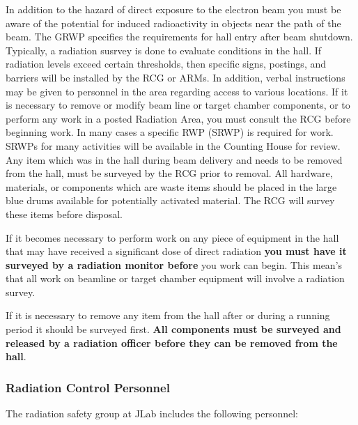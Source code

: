 {In addition to the hazard of direct exposure to the electron beam you must
be aware of the potential for induced radioactivity in objects near the path
of the beam.  The GRWP specifies the requirements for hall entry after beam shutdown.  
Typically, a radiation susrvey is done to evaluate conditions in the hall.  If radiation levels 
exceed certain thresholds, then specific signs, postings, and barriers will be installed by the 
RCG or ARMs.  In addition, verbal instructions may be given to personnel in the area 
regarding access to various locations.  If it is necessary to remove or modify beam line or 
target chamber components, or to perform any work in a posted Radiation Area, you must 
consult the RCG before beginning work.  In many cases a specific RWP (SRWP) is 
required for work.  SRWPs for many activities will be available in the Counting House for 
review.  Any item which was in the hall during beam delivery and needs to be removed 
from the hall, must be surveyed by the RCG prior to removal.  All hardware, materials, or 
components which are waste items should be placed in the large blue drums available for 
potentially activated material.  The RCG will survey these items before disposal. 

If it becomes necessary to perform work on any piece of equipment in the hall
that may have received a significant dose of direct radiation {\bf you
must have it surveyed by a radiation monitor before} you work can begin.
This mean's that all work on beamline or target chamber equipment will
involve a radiation survey.

If it is necessary to remove any item from the hall after or during a running
period it should be surveyed first. {\bf All components must be surveyed
and released by a radiation officer before they can be removed from the hall}.

\subsubsection{Radiation Control Personnel}

The radiation safety group at JLab includes the following personnel:

}
